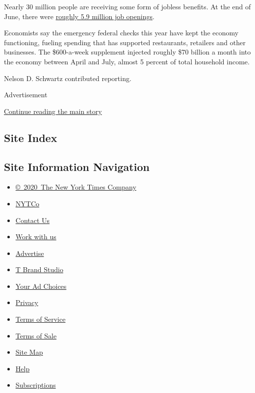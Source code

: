 Nearly 30 million people are receiving some form of jobless benefits. At
the end of June, there were
\href{https://www.bls.gov/news.release/pdf/jolts.pdf}{roughly 5.9
million job openings}.

Economists say the emergency federal checks this year have kept the
economy functioning, fueling spending that has supported restaurants,
retailers and other businesses. The \$600-a-week supplement injected
roughly \$70 billion a month into the economy between April and July,
almost 5 percent of total household income.

Nelson D. Schwartz contributed reporting.

Advertisement

\protect\hyperlink{after-bottom}{Continue reading the main story}

\hypertarget{site-index}{%
\subsection{Site Index}\label{site-index}}

\hypertarget{site-information-navigation}{%
\subsection{Site Information
Navigation}\label{site-information-navigation}}

\begin{itemize}
\tightlist
\item
  \href{https://help.nytimes3xbfgragh.onion/hc/en-us/articles/115014792127-Copyright-notice}{©~2020~The
  New York Times Company}
\end{itemize}

\begin{itemize}
\tightlist
\item
  \href{https://www.nytco.com/}{NYTCo}
\item
  \href{https://help.nytimes3xbfgragh.onion/hc/en-us/articles/115015385887-Contact-Us}{Contact
  Us}
\item
  \href{https://www.nytco.com/careers/}{Work with us}
\item
  \href{https://nytmediakit.com/}{Advertise}
\item
  \href{http://www.tbrandstudio.com/}{T Brand Studio}
\item
  \href{https://www.nytimes3xbfgragh.onion/privacy/cookie-policy\#how-do-i-manage-trackers}{Your
  Ad Choices}
\item
  \href{https://www.nytimes3xbfgragh.onion/privacy}{Privacy}
\item
  \href{https://help.nytimes3xbfgragh.onion/hc/en-us/articles/115014893428-Terms-of-service}{Terms
  of Service}
\item
  \href{https://help.nytimes3xbfgragh.onion/hc/en-us/articles/115014893968-Terms-of-sale}{Terms
  of Sale}
\item
  \href{https://spiderbites.nytimes3xbfgragh.onion}{Site Map}
\item
  \href{https://help.nytimes3xbfgragh.onion/hc/en-us}{Help}
\item
  \href{https://www.nytimes3xbfgragh.onion/subscription?campaignId=37WXW}{Subscriptions}
\end{itemize}

